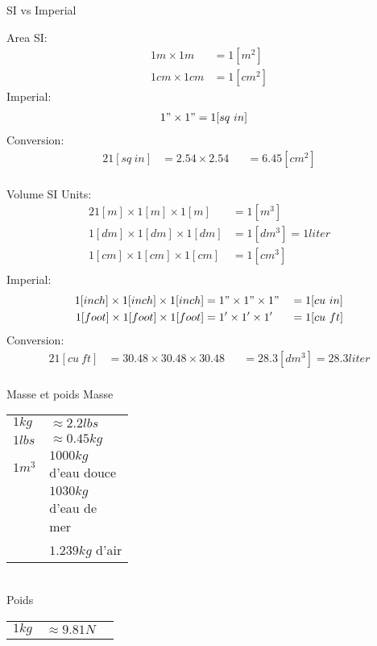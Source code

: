 \documentclass[aspectratio=1610,english,12pt]{beamer}
\begin{document}
\begin{frame}{SI vs Imperial}  
\end{frame}

\begin{frame}{Area}
	SI:
	\begin{align*}
		1m \times 1m &= 1[m^2]\\
		1cm \times 1cm &= 1[cm^2]
	\end{align*}
	Imperial:
	\begin{align*}
		1" \times 1" &= 1[sq\ in]
	\end{align*}
	Conversion:
	\begin{alignat*}{2}
				1[sq\ in] &= 2.54 \times 2.54	&	&= 6.45[cm^2]\\
	\end{alignat*}
\end{frame}

\begin{frame}{Volume}
	SI Units:
	\begin{alignat*}{2}
				1[m] \times 1[m] \times 1[m] &= 1[m^3] \\
				1[dm] \times 1[dm] \times 1[dm] &= 1[dm^3] = 1 liter\\
				1[cm] \times 1[cm] \times 1[cm] &= 1[cm^3]\\
	\end{alignat*}
	Imperial:
	\begin{alignat*}{3}
				1[inch] \times 1[inch] \times 1[inch] &= 1" \times 1"	 \times 1"	&	&= 1[cu\ in]\\
				1[foot] \times 1[foot] \times 1[foot] &= 1' \times 1'	 \times 1'	&	&= 1[cu\ ft]\\
	\end{alignat*}
	Conversion:
	\begin{alignat*}{2}
				1[cu\ ft] &= 30.48 \times 30.48 \times 30.48 &	&= 28.3 [dm^3] = 28.3 liter\\
	\end{alignat*}
\end{frame}

\begin{frame}{Masse et poids}
	Masse\\
	\begin{tabular}{p{0.3\linewidth} l}
		$1 kg$ & $\approx 2.2 lbs$ \\
		$1 lbs$ & $\approx 0.45 kg$ \\
		$1 m^3$ & $1000 kg$ d'eau douce\\
		& $1030 kg$ d'eau de mer\\
		& $ 1.239 kg$ d'air
	\end{tabular}\\
	Poids\\
	\begin{tabular}{p{0.3\linewidth} l}
		$1kg$ & $\approx9.81N$
	\end{tabular}
\end{frame}
\end{document}
